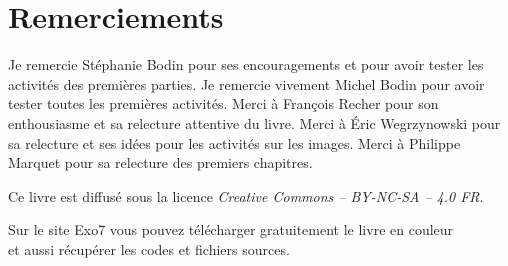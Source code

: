 
\clearemptydoublepage
\pagestyle{empty}\thispagestyle{empty}

\vspace*{\fill}

\section*{Remerciements}


Je remercie Stéphanie Bodin pour ses encouragements et pour avoir tester les activités des premières parties.
Je remercie vivement Michel Bodin pour avoir tester toutes les premières activités.
Merci à François Recher pour son enthousiasme et sa relecture attentive du livre. 
Merci à Éric Wegrzynowski pour sa relecture et ses idées pour les activités sur les images. 
Merci à Philippe Marquet pour sa relecture des premiers chapitres.




\vspace*{\fill}

\bigskip 

\begin{center}
\end{center}



\begin{center}
Ce livre est diffusé sous la licence \emph{Creative Commons -- BY-NC-SA -- 4.0 FR}.


Sur le site Exo7 vous pouvez télécharger gratuitement le livre en couleur\\
et aussi récupérer les codes et fichiers sources.

\end{center}




\printindex
{}

